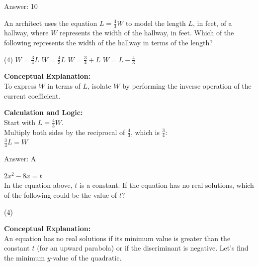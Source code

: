 \documentclass[11pt,paper=a4,answers]{exam}
\begin{document}
\begin{questions}
\begin{solution}
\vspace{25pt}

Answer: \colorbox{yellow!100}{10}
\end{solution}

\vspace{40pt}

\question
An architect uses the equation $L = \frac{4}{3}W$ to model the length $L$, in feet, of a hallway, where $W$ represents the width of the hallway, in feet. Which of the following represents the width of the hallway in terms of the length?
\begin{tasks}(4)
    \task $W = \frac{3}{4}L$
    \task $W = \frac{4}{3}L$
    \task $W = \frac{3}{4} + L$
    \task $W = L - \frac{4}{3}$
\end{tasks}

\begin{solution}
\textbf{Conceptual Explanation:} \\
To express $W$ in terms of $L$, isolate $W$ by performing the inverse operation of the current coefficient.

\vspace{20pt}

\textbf{Calculation and Logic:} \\
Start with $L = \frac{4}{3}W$. \\
Multiply both sides by the reciprocal of $\frac{4}{3}$, which is $\frac{3}{4}$: \\
$\frac{3}{4}L = W$

\vspace{25pt}

Answer: \colorbox{yellow!100}{A}
\end{solution}

\vspace{40pt}

\question
$2x^2 - 8x = t$ \\
In the equation above, $t$ is a constant. If the equation has no real solutions, which of the following could be the value of $t$?
\begin{tasks}(4)
\end{tasks}

\begin{solution}
\textbf{Conceptual Explanation:} \\
An equation has no real solutions if its minimum value is greater than the constant $t$ (for an upward parabola) or if the discriminant is negative. Let's find the minimum $y$-value of the quadratic.


\end{solution}
\end{questions}
\end{document}
